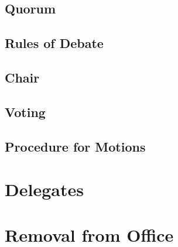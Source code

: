 \documentclass[12pt]{article} %
\begin{document}
\subsection{Quorum}
\subsection{Rules of Debate}
\subsection{Chair}
\subsection{Voting}
\subsection{Procedure for Motions}
\section{Delegates}
\section{Removal from Office}
\end{document}

